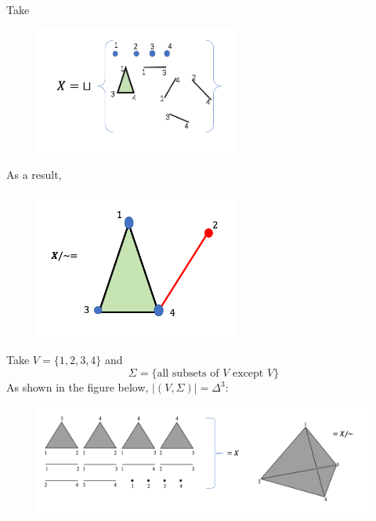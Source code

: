 \begin{example}
Take 
\begin{figure}[H]
\centering
\includegraphics[width=0.6\textwidth]{week7/p_4}
\end{figure}
As a result, 
\begin{figure}[H]
\centering
\includegraphics[width=0.6\textwidth]{week7/p_5}
\end{figure}
\end{example}

\begin{example}
Take $V=\{1,2,3,4\}$ and 
\[
\Sigma=\{\text{all subsets of $V$ except $V$}\}
\]
As shown in the figure below, $|(V,\Sigma)| = \Delta^3$:
\begin{figure}[H]
\centering
\includegraphics[width=\textwidth]{week7/p_7}
\end{figure}
\end{example}

